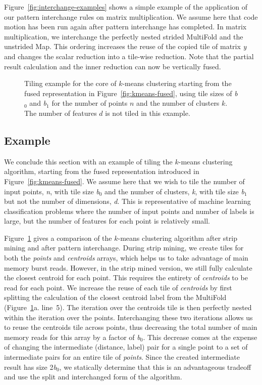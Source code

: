 

Figure~\ref{fig:interchange-examples} shows a simple example of the application of our pattern interchange rules on matrix multiplication.
We assume here that code motion has been run again after pattern interchange has completed.
In matrix multiplication, we interchange the perfectly nested strided MultiFold and the unstrided Map.
This ordering increases the reuse of the copied tile of matrix \emph{y} and changes the scalar reduction into a tile-wise reduction.
Note that the partial result calculation and the inner reduction can now be vertically fused.


\begin{figure}\small\centering

\caption{Tiling example for the core of $k$-means clustering starting from the
fused representation in Figure~\ref{fig:kmeans-fused}, using tile sizes of
\emph{b$_0$} and \emph{b$_1$} for the number of points $n$ and the number of
clusters $k$. The number of features $d$ is not tiled in this example.}
\label{fig:kmeans-example}
\end{figure}

\subsection{Example} We conclude this section with an example of tiling
the $k$-means clustering algorithm, starting from the fused representation
introduced in Figure~\ref{fig:kmeans-fused}. We assume here that we wish
to tile the number of input points, \emph{n}, with tile size \emph{b$_0$} and
the number of clusters, \emph{k}, with tile size \emph{b$_1$} but not the
number of dimensions, \emph{d}. This is representative of machine learning
classification problems where the number of input points and number of labels is
large, but the number of features for each point is relatively small.

Figure~\ref{fig:kmeans-example} gives a comparison of the $k$-means clustering
algorithm after strip mining and after pattern interchange. During strip mining,
we create tiles for both the \emph{points} and \emph{centroids} arrays, which
helps us to take advantage of main memory burst reads. However, in the strip
mined version, we still fully calculate the closest centroid for each point.
This requires the entirety of \emph{centroids} to be read for each point.
We increase the reuse of each tile of \emph{centroids} by first splitting
the calculation of the closest centroid label from the MultiFold
(Figure~\ref{fig:kmeans-example}a. line~5). The iteration over the centroids
tile is then perfectly nested within the iteration over the points.
Interchanging these two iterations allows us to reuse the centroids tile across
points, thus decreasing the total number of main memory reads for this array
by a factor of \emph{b$_0$}. This decrease comes
at the expense of changing the intermediate (distance, label) pair for a single
point to a set of intermediate pairs for an entire tile of \emph{points}.
Since the created intermediate result
has size 2\emph{b$_0$}, we statically determine that this is an advantageous
tradeoff and use the split and interchanged form of the algorithm.

